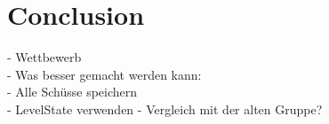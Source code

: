 \section{Conclusion}
- Wettbewerb \\
- Was besser gemacht werden kann: \\
	- Alle Schüsse speichern \\
	- LevelState verwenden
	- Vergleich mit der alten Gruppe?